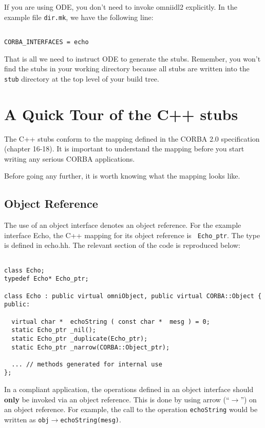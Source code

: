 \documentclass[11pt,twoside,onecolumn]{book}
\begin{document}
If you are using ODE, you don't need to invoke omniidl2 explicitly. In
the example file {\tt dir.mk}, we have the following line:

{\small
\begin{verbatim}

CORBA_INTERFACES = echo

\end{verbatim}
}

That is all we need to instruct ODE to generate the stubs. Remember, you
won't find the stubs in your working directory because all stubs are written
into the {\tt stub} directory at the top level of your build tree. 

\section{A Quick Tour of the C++ stubs}

The C++ stubs conform to the mapping defined in the CORBA 2.0 specification
(chapter 16-18). It is important to understand the mapping before you start
writing any serious CORBA applications.

Before going any further, it is worth knowing what the mapping looks like.

\subsection{Object Reference}

The use of an object interface denotes an object reference. For the
example interface Echo, the C++ mapping for its object reference is {\tt
Echo\_ptr}. The type is defined in echo.hh. The relevant section of the
code is reproduced below:

{\small
\begin{verbatim}

class Echo;
typedef Echo* Echo_ptr;

class Echo : public virtual omniObject, public virtual CORBA::Object {
public:

  virtual char *  echoString ( const char *  mesg ) = 0;
  static Echo_ptr _nil();
  static Echo_ptr _duplicate(Echo_ptr);
  static Echo_ptr _narrow(CORBA::Object_ptr);

  ... // methods generated for internal use
};

\end{verbatim}
}

In a compliant application, the operations defined in an object interface
should {\bf only} be invoked via an object reference. This is done by using
arrow (``$\rightarrow$'') on an object reference. For example, the call to the
operation {\tt echoString} would be written as {\tt obj$\rightarrow$echoString(mesg)}. 
\end{document}
